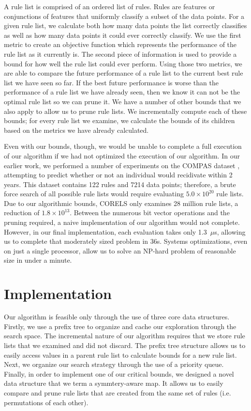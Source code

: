 \documentclass[format=sigconf]{acmart}
\begin{document}
A rule list is comprised of an ordered list of rules.
Rules are features or conjunctions of features that uniformly classify a subset of the data points. 
For a given rule list, we calculate both how many data points the list correctly classifies as well as how many data points it could ever correctly classify.
We use the first metric to create an objective function which represents the performance of the rule list as it currently is.
The second piece of information is used to provide a bound for how well the rule list could ever perform.
Using those two metrics, we are able to compare the future performance of a rule list to the current best rule list we have seen so far.
If the best future performance is worse than the performance of a rule list we have already seen, then we know it can not be the optimal rule list so we can prune it.
We have a number of other bounds that we also apply to allow us to prune rule lists.
We incrementally compute each of these bounds; for every rule list we examine, we calculate the bounds of its children based on the metrics we have already calculated.

Even with our bounds, though, we would be unable to complete a full execution of our algorithm if we had not optimized the execution of our algorithm.
In our earlier work, we performed a number of experiments on the COMPAS dataset \cite{LarsonMaKiAn16}, attempting to predict whether or not an individual would recidivate within 2 years.
This dataset contains 122 rules and 7214 data points; therefore, a brute force search of all possible rule lists would require evaluating ${5.0 \times 10^{20}}$ rule lists.
Due to our algorithmic bounds, CORELS only examines 28 million rule lists, a reduction of ${1.8 \times 10^{13}}$.
Between the numerous bit vector operations and the pruning required, a naive implementation of our algorithm would not complete.
However, in our final implementation, each evaluation takes only 1.3~$\mu$s, allowing us to complete that moderately sized problem in 36s.
Systems optimizations, even on just a single processor, allow us to solve an NP-hard problem of reasonable size in under a minute.

\section{Implementation}
Our algorithm is feasible only through the use of three core data structures.
Firstly, we use a prefix tree to organize and cache our exploration through the search space.
The incremental nature of our algorithm requires that we store rule lists that we examined and did not discard.
The prefix tree structure allows us to easily access values in a parent rule list to calculate bounds for a new rule list.
Next, we organize our search strategy through the use of a priority queue.
Finally, in order to implement one of our critical bounds, we designed a novel data structure that we term a symmtery-aware map.
It allows us to easily compare and prune rule lists that are created from the same set of rules (i.e. permutations of each other).
\end{document}
